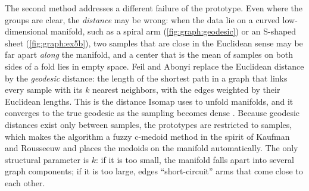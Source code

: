 The second method addresses a different failure of the prototype. Even where the groups are clear, the \emph{distance} may be wrong: when the data lie on a curved low-dimensional manifold, such as a spiral arm (\cref{fig:graph:geodesic}) or an S-shaped sheet (\cref{fig:graph:ex5b}), two samples that are close in the Euclidean sense may be far apart \emph{along} the manifold, and a center that is the mean of samples on both sides of a fold lies in empty space. Feil and Abonyi \cite{feil:2007:geodesic} replace the Euclidean distance by the \emph{geodesic} distance: the length of the shortest path in a graph that links every sample with its $k$ nearest neighbors, with the edges weighted by their Euclidean lengths. This is the distance Isomap \cite{tenenbaum:2000:isomap} uses to unfold manifolds, and it converges to the true geodesic as the sampling becomes dense \cite{bernstein:2000:geodesic}. Because geodesic distances exist only between samples, the prototypes are restricted to samples, which makes the algorithm a fuzzy c-medoid method in the spirit of Kaufman and Rousseeuw \cite{kaufman:1990:groups} and places the medoids on the manifold automatically. The only structural parameter is $k$: if it is too small, the manifold falls apart into several graph components; if it is too large, edges ``short-circuit'' arms that come close to each other.

